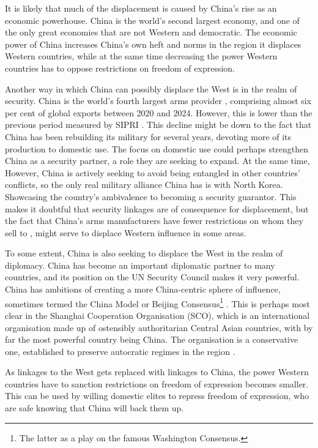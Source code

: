 It is likely that much of the displacement is caused by China's rise as an economic powerhouse. China is the world's second largest economy, and one of the only great economies that are not Western and democratic. The economic power of China increases China's own heft and norms in the region it displaces Western countries, while at the same time decreasing the power Western countries has to oppose restrictions on freedom of expression. 

Another way in which China can possibly displace the West is in the realm of security. China is the world's fourth largest arms provider \citep{george_trends_2025, gunter_chinas_2024}, comprising almost six per cent of global exports between 2020 and 2024. However, this is lower than the previous period measured by SIPRI \citep{george_trends_2025}. This decline might be down to the fact that China has been rebuilding its military for several years, devoting more of its production to domestic use. The focus on domestic use could perhaps strengthen China as a security partner, a role they are seeking to expand. At the same time, However, China is actively seeking to avoid being entangled in other countries' conflicts, so the only real military alliance China has is with North Korea. Showcasing the country's ambivalence to becoming a security guarantor. This makes it doubtful that security linkages are of consequence for displacement, but the fact that China's arms manufacturers have fewer restrictions on whom they sell to \citep{gunter_chinas_2024}, might serve to displace Western influence in some areas.

To some extent, China is also seeking to displace the West in the realm of diplomacy. China has become an important diplomatic partner to many countries, and its position on the UN Security Council makes it very powerful. China has ambitions of creating a more China-centric sphere of influence, sometimes termed the China Model or Beijing Consensus\footnote{The latter as a play on the famous Washington Consensus.} \citep{ambrosio_rise_2012, economy_exporting_2020}. This is perhaps most clear in the Shanghai Cooperation Organisation (SCO), which is an international organisation made up of ostensibly authoritarian Central Asian countries, with by far the most powerful country being China. The organisation is a conservative one, established to preserve autocratic regimes in the region \citep[p. 1322]{ambrosio_catching_2008}.

As linkages to the West gets replaced with linkages to China, the power Western countries have to sanction restrictions on freedom of expression becomes smaller. This can be used by willing domestic elites to repress freedom of expression, who are safe knowing that China will back them up.

